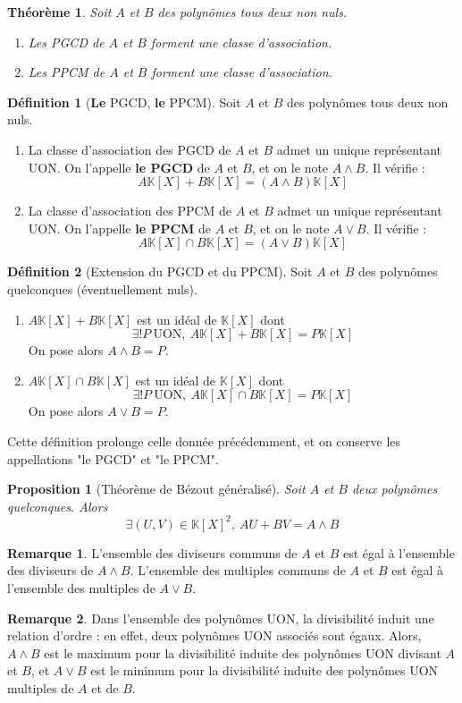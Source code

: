 \documentclass[french]{book}
\newcommand{\K}{\mathbb{K}}
\theoremstyle{plain}
\newtheorem{thm}{Théorème}[chapter]
\newtheorem{prop}{Proposition}[chapter]
\theoremstyle{definition}
\newtheorem{dfn}{Définition}[chapter]
\newtheorem{rmq}{Remarque}[chapter]
\theoremstyle{remark}
\begin{document}
\begin{thm}
	Soit $A$ et $B$ des polynômes tous deux non nuls.
	\begin{enumerate}
		\item Les PGCD de $A$ et $B$ forment une classe d'association.
		\item Les PPCM de $A$ et $B$ forment une classe d'association.
	\end{enumerate}
\end{thm}
\begin{dfn}[\textbf{Le} PGCD, \textbf{le} PPCM]
	Soit $A$ et $B$ des polynômes tous deux non nuls.
	\begin{enumerate}
		\item La classe d'association des PGCD de $A$ et $B$ admet un unique représentant UON. On l'appelle \textbf{le PGCD} de $A$ et $B$, et on le note $A\wedge B$. Il vérifie : $$A\K[X]+B\K[X]=(A\wedge B)\K[X]$$
		\item La classe d'association des PPCM de $A$ et $B$ admet un unique représentant UON. On l'appelle \textbf{le PPCM} de $A$ et $B$, et on le note $A\vee B$. Il vérifie : $$A\K[X]\cap B\K[X]=(A\vee B)\K[X]$$
	\end{enumerate}
\end{dfn}
\begin{dfn}[Extension du PGCD et du PPCM]
	Soit $A$ et $B$ des polynômes quelconques (éventuellement nuls).
	\begin{enumerate}
		\item $A\K[X]+B\K[X]$ est un idéal de $\K[X]$ dont $$\exists!P\ \text{UON},\ A\K[X]+B\K[X]=P\K[X]$$ On pose alors $A\wedge B=P$.
		\item $A\K[X]\cap B\K[X]$ est un idéal de $\K[X]$ dont $$\exists!P\ \text{UON},\ A\K[X]\cap B\K[X]=P\K[X]$$ On pose alors $A\vee B=P$.
	\end{enumerate}
	Cette définition prolonge celle donnée précédemment, et on conserve les appellations "le PGCD" et "le PPCM".
\end{dfn}
\begin{prop}[Théorème de Bézout généralisé]
	Soit $A$ et $B$ deux polynômes quelconques. Alors $$\exists (U,V)\in\K[X]^2,\ AU+BV=A\wedge B$$
\end{prop}
\begin{rmq}
	L'ensemble des diviseurs communs de $A$ et $B$ est égal à l'ensemble des diviseurs de $A\wedge B$. L'ensemble des multiples communs de $A$ et $B$ est égal à l'ensemble des multiples de $A\vee B$.
\end{rmq}
\begin{rmq}
	Dans l'ensemble des polynômes UON, la divisibilité induit une relation d'ordre : en effet, deux polynômes UON associés sont égaux. Alors, $A\wedge B$ est le maximum pour la divisibilité induite des polynômes UON divisant $A$ et $B$, et $A\vee B$ est le minimum pour la divisibilité induite des polynômes UON multiples de $A$ et de $B$.
\end{rmq}
\end{document}
